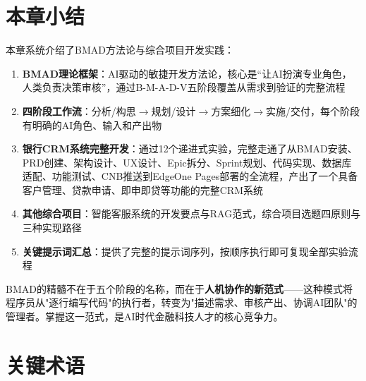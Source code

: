 \section{本章小结}

本章系统介绍了BMAD方法论与综合项目开发实践：

\begin{enumerate}[leftmargin=2em]
  \item \textbf{BMAD理论框架}：AI驱动的敏捷开发方法论，核心是``让AI扮演专业角色，人类负责决策审核''，通过B-M-A-D-V五阶段覆盖从需求到验证的完整流程

  \item \textbf{四阶段工作流}：分析/构思$\to$规划/设计$\to$方案细化$\to$实施/交付，每个阶段有明确的AI角色、输入和产出物

  \item \textbf{银行CRM系统完整开发}：通过12个递进式实验，完整走通了从BMAD安装、PRD创建、架构设计、UX设计、Epic拆分、Sprint规划、代码实现、数据库适配、功能测试、CNB推送到EdgeOne Pages部署的全流程，产出了一个具备客户管理、贷款申请、即申即贷等功能的完整CRM系统

  \item \textbf{其他综合项目}：智能客服系统的开发要点与RAG范式，综合项目选题四原则与三种实现路径

  \item \textbf{关键提示词汇总}：提供了完整的提示词序列，按顺序执行即可复现全部实验流程
\end{enumerate}

BMAD的精髓不在于五个阶段的名称，而在于\textbf{人机协作的新范式}——这种模式将程序员从"逐行编写代码"的执行者，转变为"描述需求、审核产出、协调AI团队"的管理者。掌握这一范式，是AI时代金融科技人才的核心竞争力。

\section{关键术语}

